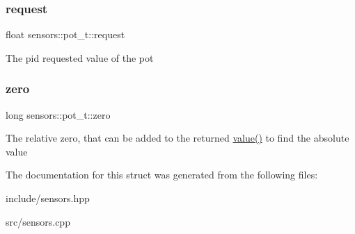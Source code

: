 \subsubsection{\texorpdfstring{request}{request}}
{\footnotesize\ttfamily float sensors\+::pot\+\_\+t\+::request}

The pid requested value of the pot \mbox{\label{structsensors_1_1pot__t_ad3678a63f0a9f4d3d3e864ec22161764}} 
\subsubsection{\texorpdfstring{zero}{zero}}
{\footnotesize\ttfamily long sensors\+::pot\+\_\+t\+::zero}

The relative zero, that can be added to the returned \hyperlink{structsensors_1_1pot__t_a239236592ff0507f459f6e8d40d12816}{value()} to find the absolute value 

The documentation for this struct was generated from the following files\+:\begin{DoxyCompactItemize}
\item 
include/sensors.\+hpp\item 
src/sensors.\+cpp\end{DoxyCompactItemize}
